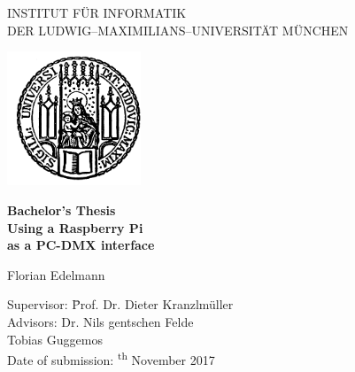 \begin{center}

\vspace*{-1cm}

{\Huge INSTITUT FÜR INFORMATIK\\[1mm]}
DER LUDWIG--MAXIMILIANS--UNIVERSITÄT MÜNCHEN\\

\vspace*{1cm}

\includegraphics[width=0.3\textwidth]{Titel/lmu_siegel}

\vspace*{3cm}

{\Large \textbf{Bachelor's Thesis}}\\ %

\vspace{2.0cm}
{\Huge \textbf{Using a Raspberry Pi}}\\
\vspace*{3mm}
{\Huge \textbf{as a PC-DMX interface}}\\
\vspace{1.5cm}

{\LARGE Florian Edelmann} %
\vspace{2.5cm}

\parbox{1cm}{
\begin{large}
\begin{tabbing}
Supervisor: \hspace{1.5cm} \=Prof. Dr. Dieter Kranzlmüller\\[2mm]
Advisors:
\>Dr. Nils gentschen Felde\\ %
\>Tobias Guggemos\\[5mm]
Date of submission: \textsuperscript{th} November 2017
\end{tabbing}
\end{large}}

\end{center}
